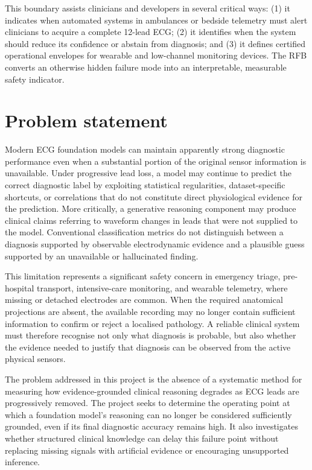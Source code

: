 \documentclass{ssnreview}
\begin{document}
This boundary assists clinicians and developers in several critical ways: (1) it indicates
when automated systems in ambulances or bedside telemetry must alert clinicians to acquire a
complete 12-lead ECG; (2) it identifies when the system should reduce its confidence or
abstain from diagnosis; and (3) it defines certified operational envelopes for wearable and
low-channel monitoring devices. The RFB converts an otherwise hidden failure mode into an
interpretable, measurable safety indicator.

\chapter{Problem statement}

Modern ECG foundation models can maintain apparently strong diagnostic performance even
when a substantial portion of the original sensor information is unavailable. Under
progressive lead loss, a model may continue to predict the correct diagnostic label by
exploiting statistical regularities, dataset-specific shortcuts, or correlations that do not
constitute direct physiological evidence for the prediction. More critically, a generative
reasoning component may produce clinical claims referring to waveform changes in leads
that were not supplied to the model. Conventional classification metrics do not distinguish
between a diagnosis supported by observable electrodynamic evidence and a plausible guess
supported by an unavailable or hallucinated finding.

This limitation represents a significant safety concern in emergency triage, pre-hospital
transport, intensive-care monitoring, and wearable telemetry, where missing or detached
electrodes are common. When the required anatomical projections are absent, the available
recording may no longer contain sufficient information to confirm or reject a localised
pathology. A reliable clinical system must therefore recognise not only what diagnosis is
probable, but also whether the evidence needed to justify that diagnosis can be observed
from the active physical sensors.

The problem addressed in this project is the absence of a systematic method for measuring
how evidence-grounded clinical reasoning degrades as ECG leads are progressively removed.
The project seeks to determine the operating point at which a foundation model's reasoning
can no longer be considered sufficiently grounded, even if its final diagnostic accuracy
remains high. It also investigates whether structured clinical knowledge can delay this
failure point without replacing missing signals with artificial evidence or encouraging
unsupported inference.
\end{document}
